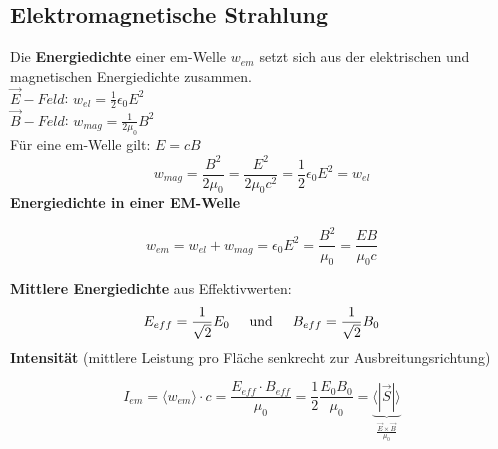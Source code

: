 \subsection{Elektromagnetische Strahlung}
Die \textbf{Energiedichte} einer em-Welle $w_{em}$ setzt sich aus der elektrischen und magnetischen Energiedichte zusammen.\\[1ex]

\hspace{10mm} $\vec{E}-Feld$: $w_{el} = \frac{1}{2}\epsilon_0 E^2$ \\
\hspace{10mm} $\vec{B}-Feld$: $w_{mag} = \frac{1}{2\mu_0} B^2$ \\[1ex]

Für eine em-Welle gilt: $E = cB$
\[
    w_{mag} = \frac{B^2}{2 \mu_0} = \frac{E^2}{2 \mu_0 c^2} = \frac{1}{2}\epsilon_0 E^2 = w_{el}
\]
\textbf{Energiedichte in einer EM-Welle}
\begin{formulabox}
    \[
        w_{em} = w_{el} + w_{mag} = \epsilon_0 E^2 = \frac{B^2}{\mu_0} = \frac{EB}{\mu_0 c}
    \]
\end{formulabox}

\textbf{Mittlere Energiedichte} aus Effektivwerten: \\
\[
    E_{eff} = \frac{1}{\sqrt{2}}E_0 \hspace{5mm} \text{und} \hspace{5mm} B_{eff} = \frac{1}{\sqrt{2}}B_0
\]
\textbf{Intensität} (mittlere Leistung pro Fläche senkrecht zur Ausbreitungsrichtung)
\begin{formulabox}
    \[
        I_{em} = \langle w_{em} \rangle \cdot c = \frac{E_{eff} \cdot B_{eff}}{\mu_0} = \frac{1}{2}\frac{E_0 B_0}{\mu_0} = \underbrace{\langle |\vec{S}| \rangle}_{\frac{\vec{E} \times \vec{B}}{\mu_0}}
    \]
\end{formulabox}
